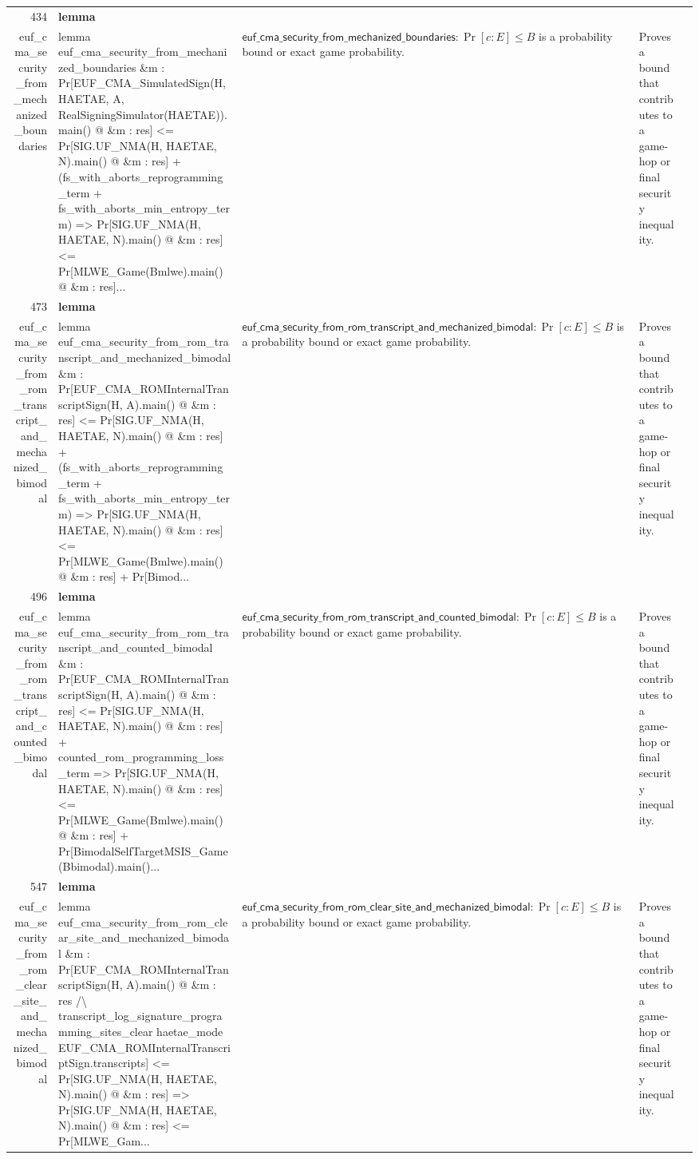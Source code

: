 \documentclass[10pt]{article}
\newcommand{\ec}[1]{\begingroup\ttfamily\scriptsize #1\endgroup}
\begin{document}
\begin{longtable}{r L{0.17\textwidth} L{0.26\textwidth} L{0.27\textwidth} L{0.20\textwidth}}
434 & \textbf{lemma}\\\ec{euf\_cma\_security\_from\_mechanized\_boundaries} & \ec{lemma euf\_cma\_security\_from\_mechanized\_boundaries \&m : Pr[EUF\_CMA\_SimulatedSign(H, HAETAE, A, RealSigningSimulator(HAETAE)).main() @ \&m : res] <= Pr[SIG.UF\_NMA(H, HAETAE, N).main() @ \&m : res] + (fs\_with\_aborts\_reprogramming\_term + fs\_with\_aborts\_min\_entropy\_term) => Pr[SIG.UF\_NMA(H, HAETAE, N).main() @ \&m : res] <= Pr[MLWE\_Game(Bmlwe).main() @ \&m : res]...} & \(\mathsf{euf\_cma\_security\_from\_mechanized\_boundaries} : \Pr[c : E] \le B\) is a probability bound or exact game probability. & Proves a bound that contributes to a game-hop or final security inequality. \\
473 & \textbf{lemma}\\\ec{euf\_cma\_security\_from\_rom\_transcript\_and\_mechanized\_bimodal} & \ec{lemma euf\_cma\_security\_from\_rom\_transcript\_and\_mechanized\_bimodal \&m : Pr[EUF\_CMA\_ROMInternalTranscriptSign(H, A).main() @ \&m : res] <= Pr[SIG.UF\_NMA(H, HAETAE, N).main() @ \&m : res] + (fs\_with\_aborts\_reprogramming\_term + fs\_with\_aborts\_min\_entropy\_term) => Pr[SIG.UF\_NMA(H, HAETAE, N).main() @ \&m : res] <= Pr[MLWE\_Game(Bmlwe).main() @ \&m : res] + Pr[Bimod...} & \(\mathsf{euf\_cma\_security\_from\_rom\_transcript\_and\_mechanized\_bimodal} : \Pr[c : E] \le B\) is a probability bound or exact game probability. & Proves a bound that contributes to a game-hop or final security inequality. \\
496 & \textbf{lemma}\\\ec{euf\_cma\_security\_from\_rom\_transcript\_and\_counted\_bimodal} & \ec{lemma euf\_cma\_security\_from\_rom\_transcript\_and\_counted\_bimodal \&m : Pr[EUF\_CMA\_ROMInternalTranscriptSign(H, A).main() @ \&m : res] <= Pr[SIG.UF\_NMA(H, HAETAE, N).main() @ \&m : res] + counted\_rom\_programming\_loss\_term => Pr[SIG.UF\_NMA(H, HAETAE, N).main() @ \&m : res] <= Pr[MLWE\_Game(Bmlwe).main() @ \&m : res] + Pr[BimodalSelfTargetMSIS\_Game(Bbimodal).main()...} & \(\mathsf{euf\_cma\_security\_from\_rom\_transcript\_and\_counted\_bimodal} : \Pr[c : E] \le B\) is a probability bound or exact game probability. & Proves a bound that contributes to a game-hop or final security inequality. \\
547 & \textbf{lemma}\\\ec{euf\_cma\_security\_from\_rom\_clear\_site\_and\_mechanized\_bimodal} & \ec{lemma euf\_cma\_security\_from\_rom\_clear\_site\_and\_mechanized\_bimodal \&m : Pr[EUF\_CMA\_ROMInternalTranscriptSign(H, A).main() @ \&m : res /\textbackslash{} transcript\_log\_signature\_programming\_sites\_clear haetae\_mode EUF\_CMA\_ROMInternalTranscriptSign.transcripts] <= Pr[SIG.UF\_NMA(H, HAETAE, N).main() @ \&m : res] => Pr[SIG.UF\_NMA(H, HAETAE, N).main() @ \&m : res] <= Pr[MLWE\_Gam...} & \(\mathsf{euf\_cma\_security\_from\_rom\_clear\_site\_and\_mechanized\_bimodal} : \Pr[c : E] \le B\) is a probability bound or exact game probability. & Proves a bound that contributes to a game-hop or final security inequality. \\

\end{longtable}
\end{document}
